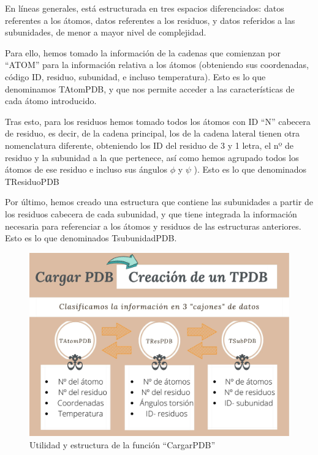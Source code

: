\documentclass[12pt]{article}
\begin{document}
En líneas generales, está estructurada en tres espacios diferenciados: datos referentes a los átomos, datos referentes a los residuos, y datos referidos a las subunidades, de menor a mayor nivel de complejidad. 
\newline

Para ello, hemos tomado la información de la cadenas que comienzan por ``ATOM'' para la información relativa a los átomos (obteniendo sus coordenadas, código ID, residuo, subunidad, e incluso temperatura). Esto es lo que denominamos TAtomPDB, y que nos permite acceder a las características de cada átomo introducido.
\newline

Tras esto, para los residuos hemos tomado todos los átomos con ID ``N'' cabecera de residuo, es decir, de la cadena principal, los de la cadena lateral tienen otra nomenclatura diferente, obteniendo los ID del residuo de 3 y 1 letra, el nº de residuo y la subunidad a la que pertenece, así como hemos agrupado todos los átomos de ese residuo e incluso sus ángulos $\phi$ y $\psi$ ). Esto es lo que denominados TResiduoPDB
\newline

Por último, hemos creado una estructura que contiene las subunidades a partir de los residuos cabecera de cada subunidad, y que tiene integrada la información necesaria para referenciar a los átomos y residuos de las estructuras anteriores. Esto es lo que denominados TsubunidadPDB.

\begin{figure}[H]
\centering
\includegraphics[scale=0.34]{Cargar PDB}
\caption{Utilidad y estructura de la función ``CargarPDB''}
\end{figure}
\end{document}
